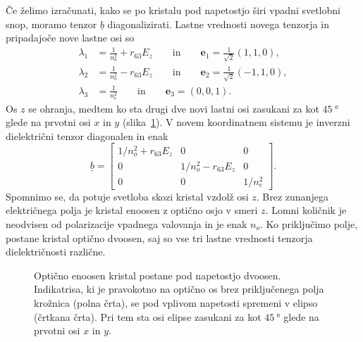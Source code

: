 Če želimo izračunati, kako se po kristalu pod napetostjo širi vpadni svetlobni
snop, moramo tenzor $\underline{b}$ diagonalizirati. Lastne vrednosti novega tenzorja
in pripadajoče nove lastne osi so
\begin{align}
\lambda_1 &= \frac{1}{n_o^2}+ r_{63}E_z \qquad \mathrm{in} \qquad \mathbf{e}_1 = \frac{1}{\sqrt{2}}(1,1,0),\\
\lambda_2 &= \frac{1}{n_o^2}- r_{63}E_z \qquad \mathrm{in} \qquad \mathbf{e}_2 = \frac{1}{\sqrt{2}}(-1,1,0),\\
\lambda_3 &= \frac{1}{n_e^2} \qquad \mathrm{in} \qquad \mathbf{e}_3 = (0,0,1).
\end{align}
Os $z$ se ohranja, medtem ko sta drugi dve novi lastni osi zasukani za kot $45~\si{\degree}$ 
glede na prvotni osi $x$ in $y$ (slika~\ref{fig:amn}).
V novem koordinatnem sistemu je inverzni dielektrični tenzor diagonalen in enak
\begin{equation}
\underline{b} = 
\left[\begin{array}{ccc}
1/n_o^2 + r_{63}E_z& 0& 0\\
0 & 1/n_o^2 - r_{63}E_z& 0\\
0 & 0& 1/n_e^2
\end{array}\right].
\end{equation}
Spomnimo se, da potuje svetloba skozi kristal vzdolž osi $z$. Brez zunanjega električnega
polja je kristal enoosen z optično osjo v smeri $z$. 
Lomni količnik je neodvisen od
polarizacije vpadnega valovanja in je enak $n_o$. Ko priključimo polje, postane kristal
optično dvoosen, saj so vse tri lastne vrednosti tenzorja dielektričnosti različne. 
\begin{figure}[ht]
\centering
\def\svgwidth{60truemm} 

\caption{Optično enoosen kristal postane pod napetostjo dvoosen. Indikatrisa, ki je pravokotno
na optično os brez priključenega polja krožnica (polna črta), se pod vplivom 
napetosti spremeni v elipso (črtkana črta). Pri tem sta osi elipse zasukani za kot 
$45~\si{\degree}$ glede na prvotni osi $x$ in $y$.}
\label{fig:amn}
\end{figure}

